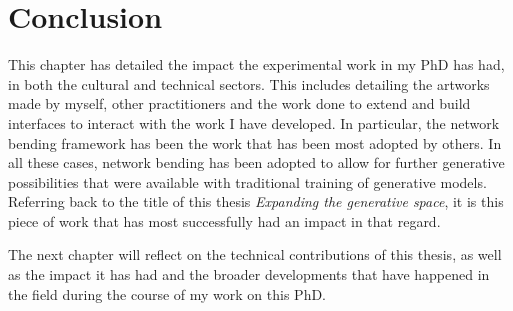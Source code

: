\section{Conclusion}

This chapter has detailed the impact the experimental work in my PhD has had, in both the cultural and technical sectors. 
This includes detailing the artworks made by myself, other practitioners and the work done to extend and build interfaces to interact with the work I have developed. 
In particular, the network bending framework has been the work that has been most adopted by others. 
In all these cases, network bending has been adopted to allow for further generative possibilities that were available with traditional training of generative models. 
Referring back to the title of this thesis \textit{Expanding the generative space}, it is this piece of work that has most successfully had an impact in that regard. 

The next chapter will reflect on the technical contributions of this thesis, as well as the impact it has had and the broader developments that have happened in the field during the course of my work on this PhD.
